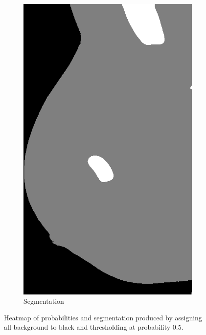 \begin{figure}[h]
\begin{subfigure}{0.2\textwidth}
                \includegraphics[width=\textwidth]{plots/segmentation.png}
         \caption{Segmentation}
	\end{subfigure}
	\caption[Post-processing pipeline]{Heatmap of probabilities and segmentation produced by assigning all background to black and thresholding at probability 0.5.}
	 \label{fig:Post-processing}
\end{figure}

